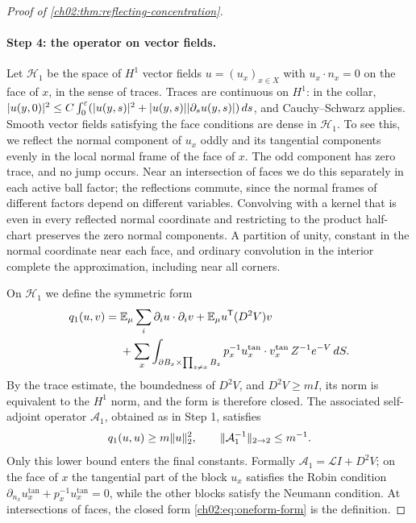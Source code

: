 \begin{proof}[Proof of \cref{ch02:thm:reflecting-concentration}]
\paragraph{Step 4: the operator on vector fields.} Let $\mathcal H_1$ be the space of $H^1$ vector fields $u=(u_x)_{x\in X}$ with $u_x\cdot n_x=0$ on the face of $x$, in the sense of traces. Traces are continuous on $H^1$: in the collar, $\lvert u(y,0)\rvert^2\le C\int_0^\varepsilon(\lvert u(y,s)\rvert^2+\lvert u(y,s)\rvert\lvert \partial_su(y,s)\rvert)\,ds$, and Cauchy--Schwarz applies. Smooth vector fields satisfying the face conditions are dense in $\mathcal H_1$. To see this, we reflect the normal component of $u_x$ oddly and its tangential components evenly in the local normal frame of the face of $x$. The odd component has zero trace, and no jump occurs. Near an intersection of faces we do this separately in each active ball factor; the reflections commute, since the normal frames of different factors depend on different variables. Convolving with a kernel that is even in every reflected normal coordinate and restricting to the product half-chart preserves the zero normal components. A partition of unity, constant in the normal coordinate near each face, and ordinary convolution in the interior complete the approximation, including near all corners.

On $\mathcal H_1$ we define the symmetric form
\begin{equation}\label{ch02:eq:oneform-form}
 \begin{split}
 q_1(u,v)={}&\mathbb E_\mu\sum_i\partial_iu\cdot\partial_iv+\mathbb E_\mu u^{\mathsf T}(D^2V)v\\
 &+\sum_x\int_{\partial B_x\times\prod_{z\ne x}B_z}p_x^{-1}u_x^{\mathrm{tan}}\cdot v_x^{\mathrm{tan}}\,Z^{-1}e^{-V}\,dS.
 \end{split}
\end{equation}
By the trace estimate, the boundedness of $D^2V$, and $D^2V\ge mI$, its norm is equivalent to the $H^1$ norm, and the form is therefore closed. The associated self-adjoint operator $\mathcal A_1$, obtained as in Step 1, satisfies
\begin{equation}\label{ch02:eq:oneform-gap}
 q_1(u,u)\ge m\lVert u\rVert_2^2,\qquad\lVert \mathcal A_1^{-1}\rVert_{2\to2}\le m^{-1}.
\end{equation}
Only this lower bound enters the final constants. Formally $\mathcal A_1=\mathcal LI+D^2V$; on the face of $x$ the tangential part of the block $u_x$ satisfies the Robin condition $\partial_{n_x}u_x^{\mathrm{tan}}+p_x^{-1}u_x^{\mathrm{tan}}=0$, while the other blocks satisfy the Neumann condition. At intersections of faces, the closed form \eqref{ch02:eq:oneform-form} is the definition.


\end{proof}

